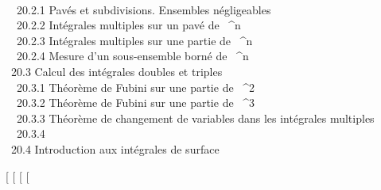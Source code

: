 \documentclass[]{article}
\begin{document}
 \\
~~20.2.1 {Pavés et
subdivisions. Ensembles négligeables} \\ ~~20.2.2
{Intégrales multiples sur un
pavé de ~^n} \\ ~~20.2.3
{Intégrales multiples sur une
partie de ~^n} \\ ~~20.2.4
{Mesure d'un sous-ensemble
borné de ~^n} \\ ~20.3
{Calcul des intégrales doubles et
triples} \\ ~~20.3.1 {Théorème
de Fubini sur une partie de ~^2} \\ ~~20.3.2
{Théorème de Fubini sur une
partie de ~^3} \\ ~~20.3.3
{Théorème de changement de
variables dans les intégrales multiples} \\ ~~20.3.4
 \\
~20.4 {Introduction aux
intégrales de surface}

[
[
[
[
\end{document}
